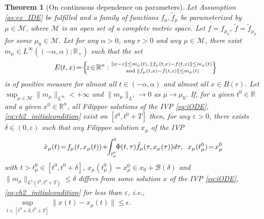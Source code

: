 \documentclass{article}
\newcommand{\R}{\mathbb{R}}
\newtheorem{theorem}{Theorem}
\begin{document}
\begin{theorem}[On continuous dependence on parameters]\itshape\label{thm:continuity_iODE}
Let Assumption \ref{as:ex_IDE} be fulfilled 
	 and a family of functions $f_\mu, \tilde f_\mu$ be  parameterized by 
	$\mu\in \mathcal{M}$, where $\mathcal{M}$ is an open set of a complete metric space. Let $f=f_{\mu_0}$, $\tilde f=\tilde f_{\mu_0}$ for some $\mu_0\in \mathcal{M}$.
	Let  for any $\alpha>0$, any $r>0$ and any $\mu\in\mathcal{M}$, there exist $m_{\mu} \in L^{\infty}((-\alpha,\alpha);\R_+)$   such that 
 the set \vspace{-1mm}
	\begin{equation}\label{eq:set_E}
	\! \,\,E(t,x)\!=\!\left\{\!z\!\in\! \R^n: \!\begin{smallmatrix}
		\|x-z\|\leq m_{\mu}(t), \,
		\|f_\mu(t,x)-f(t,z)\|\leq m_{\mu}(t)\\
		 \text{ and }\|\tilde f_\mu(t,x)-\tilde f(t,z)\|\leq m_{\mu}(t)
	\end{smallmatrix}\!\right\}\!\!\!\vspace{-1mm}
\end{equation}
	is of positive measure for almost all $t\in(-\alpha,\alpha)$ and almost all $x\!\in\! \!B(r)$. 
	Let 
	$\sup_{\mu\in \mathcal{M}}\|m_{\mu}\|_{L^{\infty}}<+\infty$ and 
	$\|m_{\mu}\|_{L^1}\to 0$ as $\mu \to \mu_0$.
	 If, for a given $t^0\in\R$ and a given $x^0\in \R^n$, 	all Filippov solutions of the IVP \eqref{eq:iODE}, \eqref{eq:ch2_initialcondition}  exist on  $[t^0,t^0+T]$ then, 
	for any  $\varepsilon>0$, there exists $\delta\in (0,\varepsilon)$ such that 
	any Filippov solution $x_{\mu}$ of the IVP\vspace{-1mm}
	\begin{equation}\label{eq:iODE_mu}
		\dot x_{\mu}(t)\!=\!f_{\mu}(t,x_{\mu}(t))\!+\!\!\int^t_{t^0_{\mu}} \!\!\Phi(t,\tau) \tilde f_{\mu}(\tau,x_{\mu}(\tau)) d\tau, \;\;x_{\mu}(t^0_{\mu})\!=\!x^0_{\mu}\vspace{-1mm}
	\end{equation}
	with $t>t^0_{\mu}\in[t^0,t^0+\delta]$, $x_{\mu}(t^0_{\mu})=x^0_{\mu}\in x_0+\mathcal{B}(\delta)$   and 
	$\|m_{\mu}\|_{L^1(t^0,t^0+T)}\!\leq\! \delta$ differs from 
	some solution $x$ of the  IVP \eqref{eq:iODE}, \eqref{eq:ch2_initialcondition} for less than $\varepsilon$, i.e., $\sup\limits_{t\in [t^0+\delta,t^0+T]}\|x(t)-x_{\mu}(t)\|\leq \epsilon$.
\end{theorem}
\end{document}
